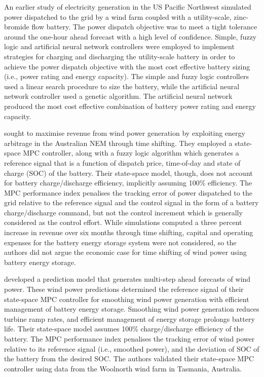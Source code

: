 An earlier study \citep{BYJYHH11} of electricity generation in the US Pacific Northwest simulated power dispatched to the grid by a wind farm coupled with a utility-scale, zinc-bromide flow battery.  The power dispatch objective was to meet a tight tolerance around the one-hour ahead forecast with a high level of confidence.  Simple, fuzzy logic and artificial neural network controllers were employed to implement strategies for charging and discharging the utility-scale battery in order to achieve the power dispatch objective with the most cost effective battery sizing (i.e., power rating and energy capacity).  The simple and fuzzy logic controllers used a linear search procedure to size the battery, while the artificial neural network controller used a genetic algorithm.  The artificial neural network produced the most cost effective combination of battery power rating and energy capacity.

\citet{KKSA13} sought to maximise revenue from wind power generation by exploiting energy arbitrage in the Australian NEM through time shifting.  They employed a state-space MPC controller, along with a fuzzy logic algorithm which generates a reference signal that is a function of dispatch price, time-of-day and state of charge (SOC) of the battery.  Their state-space model, though, does not account for battery charge/discharge efficiency, implicitly assuming 100\% efficiency.  The MPC performance index penalises the tracking error of power dispatched to the grid relative to the reference signal and the control signal in the form of a battery charge/discharge command, but not the control increment which is generally considered as the control effort.  While simulations computed a three percent increase in revenue over six months through time shifting, capital and operating expenses for the battery energy storage system were not considered, so the authors did not argue the economic case for time shifting of wind power using battery energy storage.

\citet{KS10} developed a prediction model that generates multi-step ahead forecasts of wind power.  These wind power predictions determined the reference signal of their state-space MPC controller for smoothing wind power generation with efficient management of battery energy storage.  Smoothing wind power generation reduces turbine ramp rates, and efficient management of energy storage prolongs battery life.  Their state-space model assumes 100\% charge/discharge efficiency of the battery.  The MPC performance index penalises the tracking error of wind power relative to its reference signal (i.e., smoothed power), and the deviation of SOC of the battery from the desired SOC.  The authors validated their state-space MPC controller using data from the Woolnorth wind farm in Tasmania, Australia.


